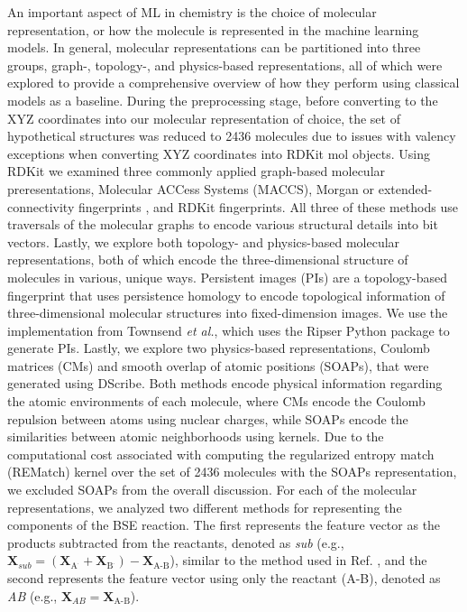 \documentclass[journal=jacsat,manuscript=article]{achemso}
\begin{document}
An important aspect of ML in chemistry is the choice of molecular representation, or how the molecule is represented in the machine learning models.\cite{jones_molecular_2023}
In general, molecular representations can be partitioned into three groups, graph-, topology-, and physics-based representations, all of which were explored to provide a comprehensive overview of how they perform using classical models as a baseline.
During the preprocessing stage, before converting to the XYZ coordinates into our molecular representation of choice, the set of hypothetical structures was reduced to 2436 molecules due to issues with valency exceptions when converting XYZ coordinates into RDKit mol objects.
Using RDKit\cite{noauthor_rdkit_nodate} we examined three commonly applied graph-based molecular preresentations, Molecular ACCess Systems (MACCS)\cite{durant_reoptimization_2002}, Morgan or extended-connectivity fingerprints \cite{morgan_generation_1965,rogers_extended-connectivity_2010}, and RDKit fingerprints.
All three of these methods use traversals of the molecular graphs to encode various structural details into bit vectors.
Lastly, we explore both topology- and physics-based molecular representations, both of which encode the three-dimensional structure of molecules in various, unique ways.
Persistent images (PIs) are a topology-based fingerprint that uses persistence homology to encode topological information of three-dimensional molecular structures into fixed-dimension images.\cite{adams_persistence_2017,townsend_representation_2020,schiff_augmenting_2022} 
We use the implementation from Townsend \textit{et al.}\cite{townsend_representation_2020}, which uses the Ripser Python package to generate PIs.\cite{tralie_ripserpy_2018}
Lastly, we explore two physics-based representations, Coulomb matrices (CMs) \cite{rupp_fast_2012} and smooth overlap of atomic positions (SOAPs), that were generated using DScribe.\cite{de_comparing_2016}
Both methods encode physical information regarding the atomic environments of each molecule, where CMs encode the Coulomb repulsion between atoms using nuclear charges, while SOAPs encode the similarities between atomic neighborhoods using kernels.
Due to the computational cost associated with computing the regularized entropy match (REMatch) kernel over the set of 2436 molecules with the SOAPs representation, we excluded SOAPs from the overall discussion.
For each of the molecular representations, we analyzed two different methods for representing the components of the BSE reaction.
The first represents the feature vector as the products subtracted from the reactants, denoted as \textit{sub} (e.g., $\mathbf{X}_{\mathit{sub}} = (\mathbf{X}_{\text{A}^{.}} + \mathbf{X}_{\text{B}^{.}}) - \mathbf{X}_{\text{A-B}}$), similar to the method used in Ref. \cite{garcia-andrade_barrier_2023}, and the second represents the feature vector using only the reactant (A-B), denoted as \textit{AB} (e.g., $\mathbf{X}_{\mathit{AB}} =  \mathbf{X}_{\text{A-B}}$).
\end{document}
